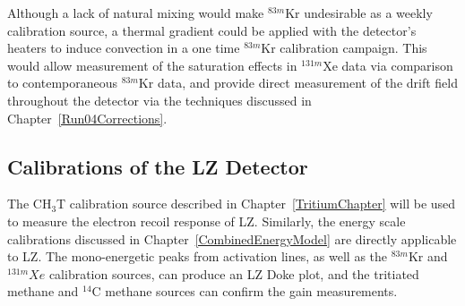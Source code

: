 Although a lack of natural mixing would make $^{83m}$Kr undesirable as a weekly calibration source, a thermal gradient could be applied with the detector's heaters to induce convection in a one time $^{83m}$Kr calibration campaign.  This would allow measurement of the saturation effects in $^{131m}$Xe data via comparison to contemporaneous $^{83m}$Kr data, and provide direct measurement of the drift field throughout the detector via the techniques discussed in Chapter~\ref{Run04Corrections}. 


\subsection{Calibrations of the LZ Detector}

The CH$_3$T calibration source described in Chapter~\ref{TritiumChapter} will be used to measure the electron recoil response of LZ.  Similarly, the energy scale calibrations discussed in Chapter~\ref{CombinedEnergyModel} are directly applicable to LZ.  The mono-energetic peaks from activation lines, as well as the $^{83m}$Kr and $^{131m}Xe$ calibration sources, can produce an LZ Doke plot, and the tritiated methane and $^{14}$C methane sources can confirm the gain measurements.

